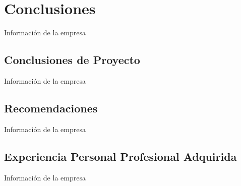 \renewcommand{\thesection}{\Roman{section}}
\section{Conclusiones}

{\large Información de la empresa}\\

\renewcommand{\thesection}{\arabic{section}}
\subsection{Conclusiones de Proyecto}

{\large Información de la empresa}\\

\subsection{Recomendaciones}

{\large Información de la empresa}\\

\subsection{Experiencia Personal Profesional Adquirida}

{\large Información de la empresa}\\